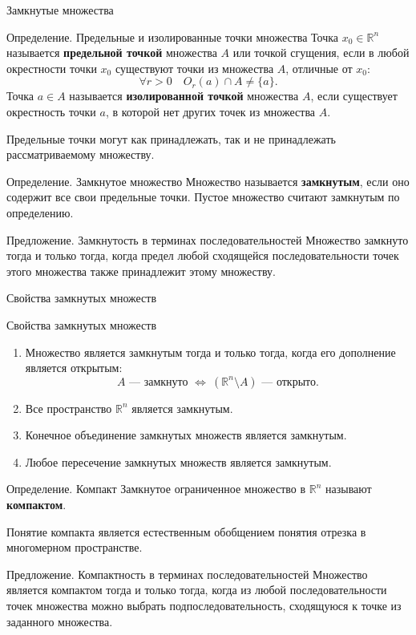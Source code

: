 \documentclass[8pt]{beamer}
\begin{document}
\begin{frame}{Замкнутые множества}
\begin{block}{Определение. Предельные и изолированные точки множества}
Точка $x_0\in\mathbb{R}^n$ называется {\bf предельной точкой} множества $A$ или точкой сгущения, если в любой окрестности точки $x_0$ существуют точки из множества $A$, отличные от $x_0$:
$$\forall r>0\quad O_r(a)\cap A\ne \{a\}.$$
Точка $a\in A$ называется {\bf изолированной точкой} множества $A$, если существует окрестность точки $a$, в которой нет других точек из множества $A$.
\end{block}
Предельные точки могут как принадлежать, так и не принадлежать рассматриваемому множеству.

\begin{block}{Определение. Замкнутое множество}
Множество называется {\bf замкнутым}, если оно содержит все свои предельные точки. Пустое множество считают замкнутым по определению.
\end{block}
\begin{block}{Предложение. Замкнутость в терминах последовательностей}
Множество замкнуто тогда и только тогда, когда предел любой сходящейся последовательности точек этого множества также принадлежит этому множеству.
\end{block}
\end{frame}

\begin{frame}{Свойства замкнутых множеств}
\begin{block}{Свойства замкнутых множеств}
\begin{enumerate}
\item Множество является замкнутым тогда и только тогда, когда его дополнение является открытым:
$$A\text{ --- замкнуто }\iff\ (\mathbb{R}^n\setminus A)\text{ --- открыто.}$$
\item Все пространство $\mathbb{R}^n$ является замкнутым.
\item Конечное объединение замкнутых множеств является замкнутым.
\item Любое пересечение замкнутых множеств является замкнутым.
\end{enumerate}
\end{block}
\begin{block}{Определение. Компакт}
Замкнутое ограниченное множество в $\mathbb{R}^n$ называют {\bf компактом}.
\end{block}
Понятие компакта является естественным обобщением понятия отрезка в многомерном пространстве.
\begin{block}{Предложение. Компактность в терминах последовательностей}
Множество является компактом тогда и только тогда, когда из любой последовательности точек множества можно выбрать подпоследовательность, сходящуюся к точке из заданного множества.
\end{block}
\end{frame}
\end{document}
